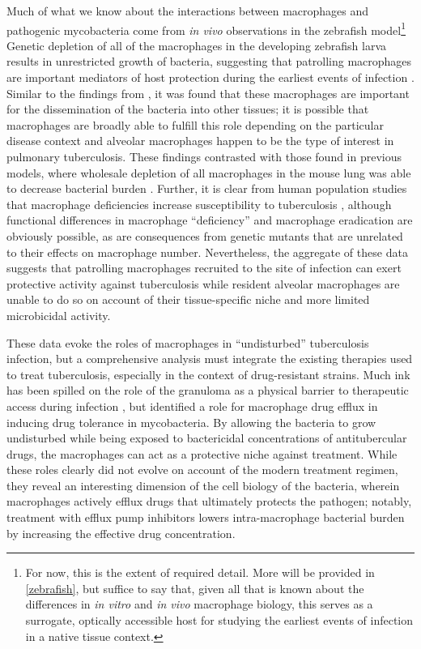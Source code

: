 Much of what we know about the interactions between macrophages and pathogenic mycobacteria come from \textit{in vivo} observations in the zebrafish model\footnote{For now, this is the extent of required detail. More will be provided in \autoref{zebrafish}, but suffice to say that, given all that is known about the differences in \textit{in vitro} and \textit{in vivo} macrophage biology, this serves as a surrogate, optically accessible host for studying the earliest events of infection in a native tissue context.} Genetic depletion of all of the macrophages in the developing zebrafish larva results in unrestricted growth of bacteria, suggesting that patrolling macrophages are important mediators of host protection during the earliest events of infection \citep{Clay2007}. Similar to the findings from \citeauthor{Cohen2018}, it was found that these macrophages are important for the dissemination of the bacteria into other tissues; it is possible that macrophages are broadly able to fulfill this role depending on the particular disease context and alveolar macrophages happen to be the type of interest in pulmonary tuberculosis. These findings contrasted with those found in previous models, where wholesale depletion of all macrophages in the mouse lung was able to decrease bacterial burden \citep{Leemans2005}. Further, it is clear from human population studies that macrophage deficiencies increase susceptibility to tuberculosis \citep{Hambleton2011}, although functional differences in macrophage ``deficiency'' and macrophage eradication are obviously possible, as are consequences from genetic mutants that are unrelated to their effects on macrophage number. Nevertheless, the aggregate of these data suggests that patrolling macrophages recruited to the site of infection can exert protective activity against tuberculosis while resident alveolar macrophages are unable to do so on account of their tissue\hyp{}specific niche and more limited microbicidal activity.

These data evoke the roles of macrophages in ``undisturbed'' tuberculosis infection, but a comprehensive analysis must integrate the existing therapies used to treat tuberculosis, especially in the context of drug\hyp{}resistant strains. Much ink has been spilled on the role of the granuloma as a physical barrier to therapeutic access during infection \citep{Ekins2014, Cronan2022, Driver2012, Cicchese2020}, but \citet{Adams2011} identified a role for macrophage drug efflux in inducing drug tolerance in mycobacteria. By allowing the bacteria to grow undisturbed while being exposed to bactericidal concentrations of antitubercular drugs, the macrophages can act as a protective niche against treatment. While these roles clearly did not evolve on account of the modern treatment regimen, they reveal an interesting dimension of the cell biology of the bacteria, wherein macrophages actively efflux drugs that ultimately protects the pathogen; notably, treatment with efflux pump inhibitors lowers intra\hyp{}macrophage bacterial burden by increasing the effective drug concentration.

